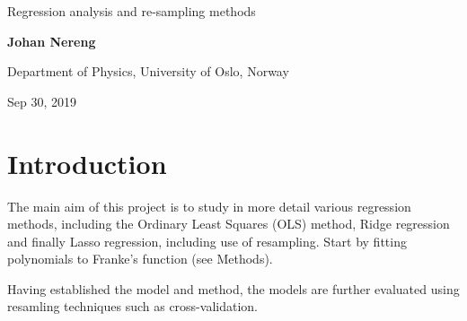 \documentclass[%
oneside,                 %
final,                   %
10pt]{article}
\begin{document}

\newcommand{\exercisesection}[1]{\subsection*{#1}}






\thispagestyle{empty}

\begin{center}
{\LARGE\bf
\begin{spacing}{1.25}
Regression analysis and re-sampling methods
\end{spacing}
}
\end{center}


\begin{center}
{\bf Johan Nereng}
\end{center}

    \begin{center}
\centerline{{\small Department of Physics, University of Oslo, Norway}}
\end{center}
    

\begin{center}
Sep 30, 2019
\end{center}

\vspace{5cm}
\begin{abstract}

\end{abstract}

\newpage

\section{Introduction}
The main aim of this project is to study in more detail various regression methods,
including the Ordinary Least Squares (OLS) method, Ridge regression and finally
Lasso regression, including use of resampling. Start by fitting polynomials to Franke's function (see Methods). 

Having established the model and method, the models are further evaluated using resamling
techniques such as cross-validation.
\end{document}
